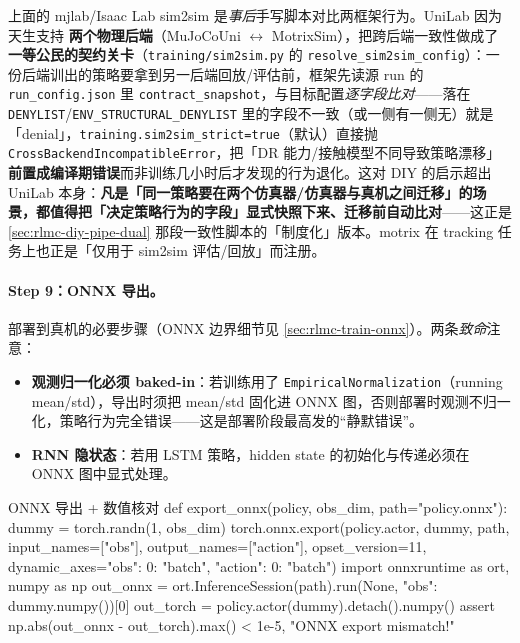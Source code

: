 \begin{insight}\label{ins:rlmc-diy-sim2sim-contract}
上面的 mjlab/Isaac Lab sim2sim 是\emph{事后}手写脚本对比两框架行为。UniLab 因为天生支持 \textbf{两个物理后端}（MuJoCoUni $\leftrightarrow$ MotrixSim），把跨后端一致性做成了\textbf{一等公民的契约关卡}（\verb|training/sim2sim.py| 的 \verb|resolve_sim2sim_config|）：一份后端训出的策略要拿到另一后端回放/评估前，框架先读源 run 的 \verb|run_config.json| 里 \verb|contract_snapshot|，与目标配置\emph{逐字段比对}——落在 \verb|DENYLIST|/\verb|ENV_STRUCTURAL_DENYLIST| 里的字段不一致（或一侧有一侧无）就是「denial」，\verb|training.sim2sim_strict=true|（默认）直接抛 \verb|CrossBackendIncompatibleError|，把「DR 能力/接触模型不同导致策略漂移」\textbf{前置成编译期错误}而非训练几小时后才发现的行为退化。这对 DIY 的启示超出 UniLab 本身：\textbf{凡是「同一策略要在两个仿真器/仿真器与真机之间迁移」的场景，都值得把「决定策略行为的字段」显式快照下来、迁移前自动比对}——这正是 \cref{sec:rlmc-diy-pipe-dual} 那段一致性脚本的「制度化」版本。motrix 在 tracking 任务上也正是「仅用于 sim2sim 评估/回放」而注册。
\end{insight}

\paragraph{Step 9：ONNX 导出。}部署到真机的必要步骤（ONNX 边界细节见 \cref{sec:rlmc-train-onnx}）。两条\emph{致命}注意：

\begin{itemize}
\item \textbf{观测归一化必须 baked-in}：若训练用了 \verb|EmpiricalNormalization|（running mean/std），导出时须把 mean/std 固化进 ONNX 图，否则部署时观测不归一化，策略行为完全错误——这是部署阶段最高发的“静默错误”。
\item \textbf{RNN 隐状态}：若用 LSTM 策略，hidden state 的初始化与传递必须在 ONNX 图中显式处理。
\end{itemize}

\begin{codebox}[Python]{ONNX 导出 + 数值核对}
def export_onnx(policy, obs_dim, path="policy.onnx"):
    dummy = torch.randn(1, obs_dim)
    torch.onnx.export(policy.actor, dummy, path,
        input_names=["obs"], output_names=["action"], opset_version=11,
        dynamic_axes={"obs": {0: "batch"}, "action": {0: "batch"}})
    import onnxruntime as ort, numpy as np
    out_onnx = ort.InferenceSession(path).run(None, {"obs": dummy.numpy()})[0]
    out_torch = policy.actor(dummy).detach().numpy()
    assert np.abs(out_onnx - out_torch).max() < 1e-5, "ONNX export mismatch!"
\end{codebox}

